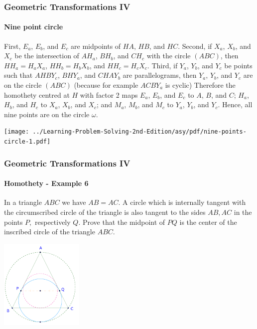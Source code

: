 \documentclass[8pt,xcolor=table,dvipsnames]{beamer}
\begin{document}
\begin{frame}[t]
    \frametitle{Geometric Transformations IV}
    \framesubtitle{Nine point circle}
    \begin{overprint}
        First, $E_a$, $E_b$, and $E_c$ are midpoints of $HA$, $HB$, and $HC$.
        Second, if $X_a$, $X_b$, and $X_c$ be the intersection of $AH_a$, $BH_b$, and $CH_c$ with the circle $(ABC)$,
        then $HH_a=H_aX_a$, $HH_b=H_bX_b$, and $HH_c=H_cX_c$.
        Third, if $Y_a$, $Y_b$, and $Y_c$ be points such that $AHBY_c$, $BHY_a$, and $CHAY_b$ are parallelograms,
        then $Y_a$, $Y_b$, and $Y_c$ are on the circle $(ABC)$ (because for example $ACBY_a$ is cyclic)
        Therefore the homothety centred at $H$ with factor 2 maps
        $E_a$, $E_b$, and $E_c$ to $A$, $B$, and $C$;
        $H_a$, $H_b$, and $H_c$ to $X_a$, $X_b$, and $X_c$;
        and $M_a$, $M_b$, and $M_c$ to $Y_a$, $Y_b$, and $Y_c$.
        \bigbreak
        Hence, all nine points are on the circle $\omega.$
    \end{overprint}
    \begin{center}
        \texttt{[image: ../Learning-Problem-Solving-2nd-Edition/asy/pdf/nine-points-circle-1.pdf]}
    \end{center}
\end{frame}

\begin{frame}[t]
    \frametitle{Geometric Transformations IV}
    \framesubtitle{Homothety - Example 6}
    \begin{example}
        In a triangle $ABC$ we have $AB = AC.$
        A circle which is internally tangent with the circumscribed circle of the triangle
        is also tangent to the sides $AB, AC$ in the points $P,$ respectively $Q.$
        \bigbreak
        Prove that the midpoint of $PQ$ is the center of the inscribed circle of the triangle $ABC.$
    \end{example}
    \begin{center}
        \includegraphics[width=4cm]{./svg/pdf/homothety-p6a.pdf}
    \end{center}
\end{frame}
\end{document}

